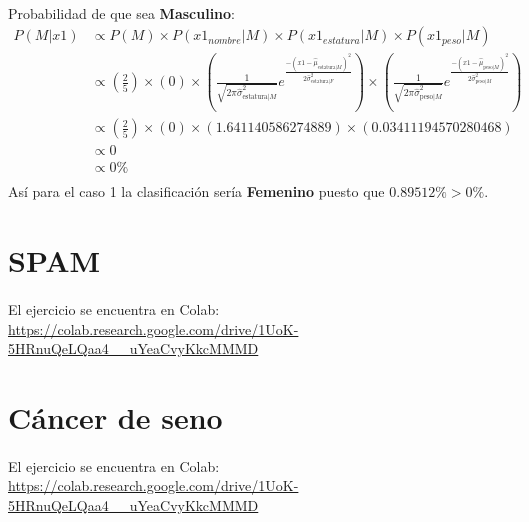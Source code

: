 \documentclass[12pt]{article}
\begin{document}
\paragraph{}Probabilidad de que sea \textbf{Masculino}:\\
\begin{equation}
\begin{split}
P(M|x1) &\propto P(M) \times P(x1_{nombre}|M) \times P(x1_{estatura}|M) \times P(x1_{peso}|M) \\
&\propto (\frac{2}{5}) \times (0) \times (\frac{1}{\sqrt{2\pi\hat{\sigma}_{\text{estatura}|M}^2}}e^{\frac{-(x1 - \hat{\mu}_{\text{estatura}|M})^2}{2\hat{\sigma}_{\text{estatura}|F}^2}}) \times (\frac{1}{\sqrt{2\pi\hat{\sigma}_{\text{peso}|M}^2}}e^{\frac{-(x1 - \hat{\mu}_{\text{peso}|M})^2}{2\hat{\sigma}_{\text{peso}|M}^2}}) \\
&\propto (\frac{2}{5}) \times (0) \times (1.641140586274889) \times (0.03411194570280468) \\
&\propto 0 \\
&\propto 0 \% \\
\end{split}
\end{equation}
Así para el caso 1 la clasificación sería \textbf{Femenino} puesto que $0.89512\% > 0\%$.\\
\clearpage
\pagebreak
\section{SPAM}
\paragraph{}El ejercicio se encuentra en Colab:\\
\url{https://colab.research.google.com/drive/1UoK-5HRnuQeLQaa4__uYeaCvyKkcMMMD}
\section{Cáncer de seno}
\paragraph{}El ejercicio se encuentra en Colab:\\
\url{https://colab.research.google.com/drive/1UoK-5HRnuQeLQaa4__uYeaCvyKkcMMMD}  
\end{document}
